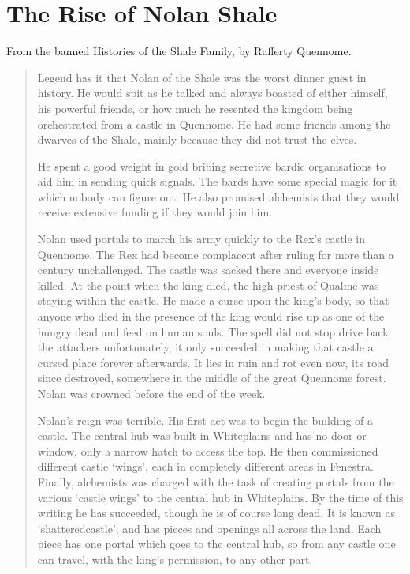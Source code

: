 \section{The Rise of Nolan Shale}
\label{nolan}

\begin{multicols}{2}

\noindent From the banned Histories of the Shale Family, by Rafferty Quennome.

\begin{quotation}

  Legend has it that Nolan of the Shale was the worst dinner guest in history.
  He would spit as he talked and always boasted of either himself, his powerful friends, or how much he resented the kingdom being orchestrated from a castle in Quennome.
  He had some friends among the dwarves of the Shale, mainly because they did not trust the elves.

  He spent a good weight in gold bribing secretive bardic organisations to aid him in sending quick signals.
  The bards have some special magic for it which nobody can figure out.
  He also promised \gls{alchemists} that they would receive extensive funding if they would join him.

  Nolan used portals to march his army quickly to the Rex's castle in Quennome.
  The Rex had become complacent after ruling for more than a century unchallenged.
  The castle was sacked there and everyone inside killed.
  At the point when the king died, the high priest of Qualm\"{e} was staying within the castle.
  He made a curse upon the king's body, so that anyone who died in the presence of the king would rise up as one of the hungry dead and feed on human souls.
  The spell did not stop drive back the attackers unfortunately, it only succeeded in making that castle a cursed place forever afterwards.
  It lies in ruin and rot even now, its road since destroyed, somewhere in the middle of the great Quennome forest.
  Nolan was crowned before the end of the week.

  Nolan's reign was terrible.
  His first act was to begin the building of a castle.
  The central hub was built in Whiteplains and has no door or window, only a narrow hatch to access the top.
  He then commissioned different castle `wings', each in completely different areas in Fenestra.
  Finally, \gls{alchemists} was charged with the task of creating portals from the various `castle wings' to the central hub in Whiteplains.
  By the time of this writing he has succeeded, though he is of course long dead.
  It is known as `\gls{shatteredcastle}', and has pieces and openings all across the land.
  Each piece has one portal which goes to the central hub, so from any castle one can travel, with the king's permission, to any other part.


\end{quotation}
\end{multicols}
